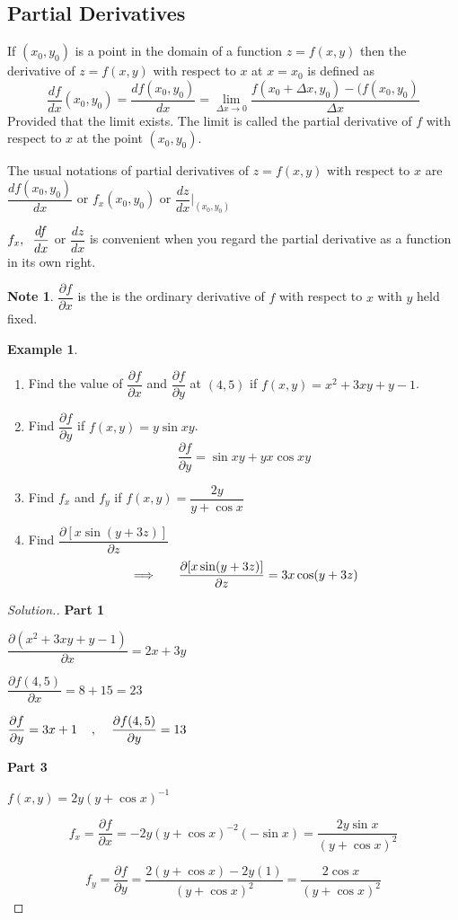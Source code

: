 \documentclass[11pt,a4paper]{article}
\theoremstyle{definition}
\newtheorem{exa}[thm]{Example}
\newtheorem*{note}{Note}
\newenvironment{solution}
  {\renewcommand{\qedsymbol}{}\begin{proof}[\textit{Solution}.]}
  {\end{proof}}
\newcommand{\subhead}[1]{%
  \par\medskip\noindent\textbf{#1}\par\nobreak\smallskip}
\begin{document}
\subsection{Partial Derivatives}
If $(x_0,y_0)$ is a point in the domain of a function $z = f(x,y)$ then the derivative of $z = f(x,y)$ with respect to $x$ at $x = x_0$ is defined as $$\dfrac{df}{dx}(x_0,y_0) = \dfrac{d f(x_0,y_0)}{dx} = \lim\limits_{\Delta x \rightarrow 0} \frac{f(x_0 + \Delta x, y_0) - (f(x_0,y_0)}{\Delta x}$$
Provided that the limit exists. The limit is called the partial derivative of $f$ with respect to $x$ at the point $(x_0,y_0)$.


The usual notations of partial derivatives of $z = f(x,y)$ with respect to $x$ are $\dfrac{d f(x_0,y_0)}{dx}$ or $f_x(x_0,y_0)$ or $\dfrac{dz}{dx}\Bigg|_{(x_0,y_0)}$


$f_x,\hspace{0.2cm} \dfrac{d f}{dx}$ or $\dfrac{d z}{dx}$ is convenient when you regard the partial derivative as a function in its own right.


\begin{note}
$\dfrac{\partial f}{\partial x}$ is the is the ordinary derivative of $f$ with respect to $x$ with $y$ held fixed.
\end{note}


\begin{exa}
\begin{enumerate}
\item Find the value of $\dfrac{\partial f}{\partial x}$ and $\dfrac{\partial f}{\partial y}$ at $(4,5)$ if $f(x,y) = x^2 + 3xy + y - 1$.
\item Find $\dfrac{\partial f}{\partial y}$ if $f(x,y) = y \sin xy$.
$$\frac{\partial f}{\partial y} = \sin xy + yx\cos xy$$
\item Find $f_x$ and $f_y$ if $f(x,y) = \dfrac{2y}{y + \cos x}$
\item Find $\dfrac{\partial [x\sin (y + 3z)]}{\partial z}$
$$\implies\hspace{0.5cm} \dfrac{\partial [x\sin (y + 3z)]}{\partial z} = 3x \cos (y + 3z)$$
\end{enumerate}
\end{exa}

\begin{solution}
\subhead{Part 1}
$\dfrac{\partial (x^2 + 3xy + y - 1)}{\partial x} = 2x + 3y$

$\dfrac{\partial f(4,5)}{\partial x} = 8 + 15 = 23$

$\dfrac{\partial f}{\partial y}= 3x + 1 \hspace{0.4cm} , \hspace{0.4cm} \dfrac{\partial f(4,5)}{\partial y} = 13$

\subhead{Part 3}
$f(x,y) = 2y(y + \cos x)^{-1}$

$$f_x =  \frac{\partial f}{\partial x} = -2y(y + \cos x)^{-2} (-\sin x) = \dfrac{2y\sin x}{(y + \cos x)^2}$$

$$f_y = \frac{\partial f}{\partial y} = \dfrac{2(y + \cos x) - 2y(1)}{(y + \cos x)^2} = \frac{2\cos x}{(y + \cos x)^2}$$
\end{solution}
\end{document}
